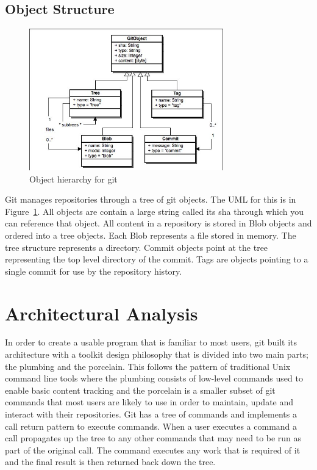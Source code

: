 \documentclass[12pt]{article}
\begin{document}
\subsection{Object Structure}
\begin{figure}[htbp]
\centering
\includegraphics[width=0.75\textwidth]{objects.jpeg}
\caption{Object hierarchy for git}
\label{fig:objects}
\end{figure}

Git manages repositories through a tree of git objects. The UML for this is in Figure~\ref{fig:objects}. All objects are contain a large string called its sha through which you can reference that object. All content in a repository is stored in Blob objects and ordered into a tree objects. Each Blob represents a file stored in memory. The tree structure represents a directory. Commit objects point at the tree representing the top level directory of the commit. Tags are objects pointing to a single commit for use by the repository history.

\section{Architectural Analysis}
In order to create a usable program that is familiar to most users, git built its architecture with a toolkit design philosophy that is divided into two main parts; the plumbing and the porcelain. This follows the pattern of traditional Unix command line tools where the plumbing consists of low-level commands used to enable basic content tracking and the porcelain is a smaller subset of git commands that most users are likely to use in order to maintain, update and interact with their repositories. Git has a tree of commands and implements a call return pattern to execute commands. When a user executes a command a call propagates up the tree to any other commands that may need to be run as part of the original call. The command executes any work that is required of it and the final result is then returned back down the tree.
\end{document}
